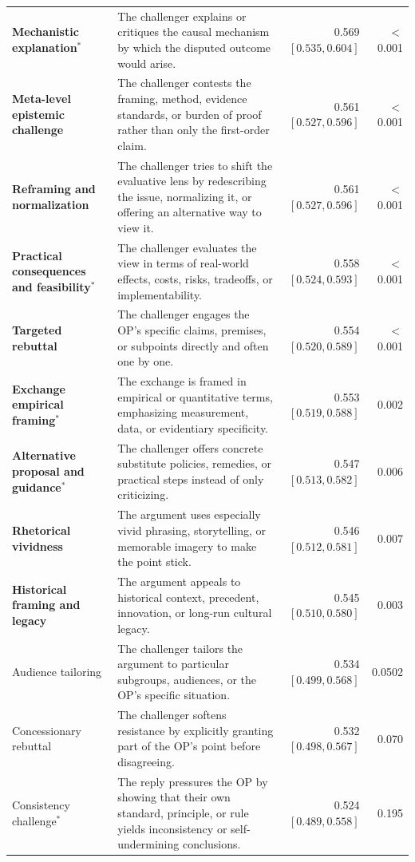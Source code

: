 \begin{tabularx}{\textwidth}{@{}>{\raggedright\arraybackslash}p{} X r r@{}}
\bfseries Mechanistic explanation$^{*}$ & The challenger explains or critiques the causal mechanism by which the disputed outcome would arise. & 0.569 {\tiny$[0.535, 0.604]$} & $<$0.001 \\
\bfseries Meta-level epistemic challenge & The challenger contests the framing, method, evidence standards, or burden of proof rather than only the first-order claim. & 0.561 {\tiny$[0.527, 0.596]$} & $<$0.001 \\
\bfseries Reframing and normalization & The challenger tries to shift the evaluative lens by redescribing the issue, normalizing it, or offering an alternative way to view it. & 0.561 {\tiny$[0.527, 0.596]$} & $<$0.001 \\
\bfseries Practical consequences and feasibility$^{*}$ & The challenger evaluates the view in terms of real-world effects, costs, risks, tradeoffs, or implementability. & 0.558 {\tiny$[0.524, 0.593]$} & $<$0.001 \\
\bfseries Targeted rebuttal & The challenger engages the OP's specific claims, premises, or subpoints directly and often one by one. & 0.554 {\tiny$[0.520, 0.589]$} & $<$0.001 \\
\bfseries Exchange empirical framing$^{*}$ & The exchange is framed in empirical or quantitative terms, emphasizing measurement, data, or evidentiary specificity. & 0.553 {\tiny$[0.519, 0.588]$} & 0.002 \\
\bfseries Alternative proposal and guidance$^{*}$ & The challenger offers concrete substitute policies, remedies, or practical steps instead of only criticizing. & 0.547 {\tiny$[0.513, 0.582]$} & 0.006 \\
\bfseries Rhetorical vividness & The argument uses especially vivid phrasing, storytelling, or memorable imagery to make the point stick. & 0.546 {\tiny$[0.512, 0.581]$} & 0.007 \\
\bfseries Historical framing and legacy & The argument appeals to historical context, precedent, innovation, or long-run cultural legacy. & 0.545 {\tiny$[0.510, 0.580]$} & 0.003 \\
Audience tailoring & The challenger tailors the argument to particular subgroups, audiences, or the OP's specific situation. & 0.534 {\tiny$[0.499, 0.568]$} & 0.0502 \\
Concessionary rebuttal & The challenger softens resistance by explicitly granting part of the OP's point before disagreeing. & 0.532 {\tiny$[0.498, 0.567]$} & 0.070 \\
Consistency challenge$^{*}$ & The reply pressures the OP by showing that their own standard, principle, or rule yields inconsistency or self-undermining conclusions. & 0.524 {\tiny$[0.489, 0.558]$} & 0.195 \\

\end{tabularx}
